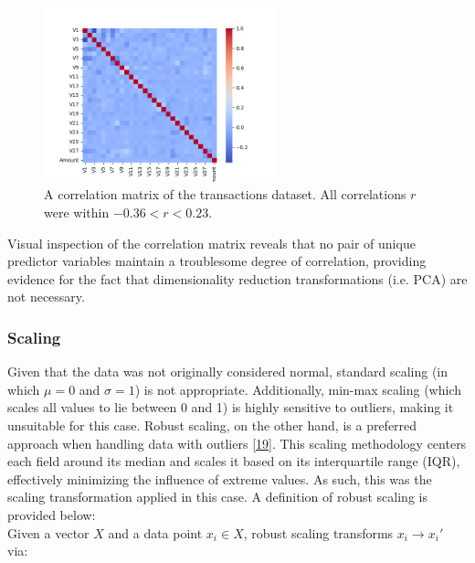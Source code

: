 \documentclass[11pt, oneside]{article}   	%
\begin{document}
\begin{figure}[h!]
	\centering
	\includegraphics[width=0.6\textwidth]{figures/fig_4.png}
	\captionsetup{font=small} 
	\caption{A correlation matrix of the transactions dataset. All correlations $r$ were within $-0.36 < r < 0.23$.}
	\label{fig4}
\end{figure}

Visual inspection of the correlation matrix reveals that no pair of unique predictor variables maintain a troublesome degree of correlation, providing evidence for the fact that dimensionality reduction transformations (i.e. PCA) are not necessary. 




\subsubsection{Scaling}

Given that the data was not originally considered normal, standard scaling (in which $\mu=0$ and $\sigma=1$) is not appropriate. Additionally, min-max scaling (which scales all values to lie between 0 and 1) is highly sensitive to outliers, making it unsuitable for this case. Robust scaling, on the other hand, is a preferred approach when handling data with outliers [\href{https://books.google.com/books/about/Exploratory_Data_Analysis.html?id=UT9dAAAAIAAJ}{19}]. This scaling methodology centers each field around its median and scales it based on its interquartile range (IQR), effectively minimizing the influence of extreme values. As such, this was the scaling transformation applied in this case. A definition of robust scaling is provided below:\\

Given a vector $X$ and a data point $x_i \in X$, robust scaling transforms \( x_i \to x_i' \) via:
\end{document}
